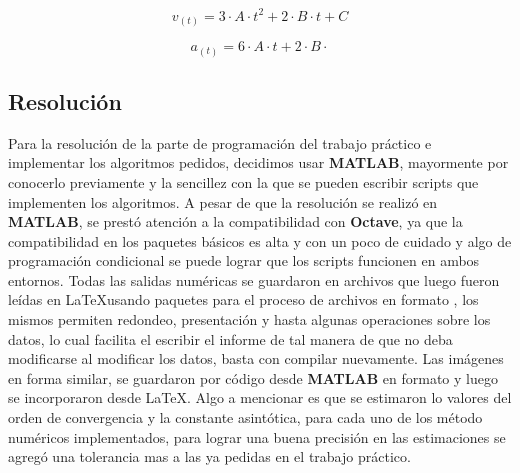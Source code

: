 \begin{equation}
v_{(t)} = 3 \cdot A \cdot t^{2} + 2 \cdot B \cdot t + C
\end{equation}

\begin{equation}
a_{(t)} = 6 \cdot A \cdot t + 2 \cdot B \cdot
\end{equation}


\clearpage


\subsection{Resolución}

Para la resolución de la parte de programación del trabajo práctico e implementar los algoritmos pedidos, decidimos usar \textbf{MATLAB}, mayormente por conocerlo previamente y la sencillez con la que se pueden escribir scripts que implementen los algoritmos. A pesar de que la resolución se realizó en \textbf{MATLAB}, se prestó atención a la compatibilidad con \textbf{Octave}, ya que la compatibilidad en los paquetes básicos es alta y con un poco de cuidado y algo de programación condicional se puede lograr que los scripts funcionen en ambos entornos.
Todas las salidas numéricas se guardaron en archivos que luego fueron leídas en \LaTeX\space usando paquetes para el proceso de archivos en formato \textbf{}, los mismos permiten redondeo, presentación y hasta algunas operaciones sobre los datos, lo cual facilita el escribir el informe de tal manera de que no deba modificarse al modificar los datos, basta con compilar nuevamente. Las imágenes en forma similar, se guardaron por código desde \textbf{MATLAB} en formato \textbf{} y luego se incorporaron desde \LaTeX. Algo a mencionar es que se estimaron lo valores del orden de convergencia y la constante asintótica, para cada uno de los método numéricos implementados, para lograr una buena precisión en las estimaciones se agregó una tolerancia mas a las ya pedidas en el trabajo práctico.


